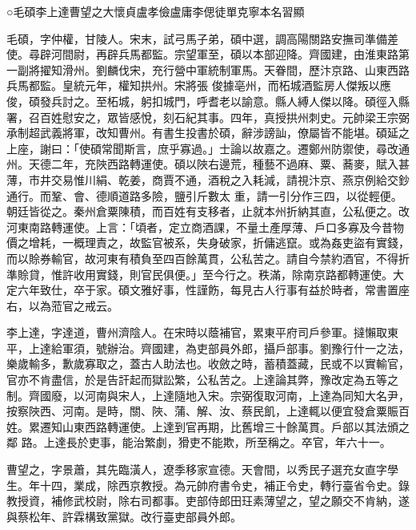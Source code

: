 
\begin{pinyinscope}

 ○毛碩李上達曹望之大懷貞盧孝儉盧庸李偲徒單克寧本名習顯



 毛碩，字仲權，甘陵人。宋末，試弓馬子弟，碩中選，調高陽關路安撫司準備差使。尋辟河間尉，再辟兵馬都監。宗望軍至，碩以本部迎降。齊國建，由淮東路第一副將擢知滑州。劉麟伐宋，充行營中軍統制軍馬。天眷間，歷汴京路、山東西路兵馬都監。皇統元年，權知拱州。宋將張
 俊據亳州，而柘城酒監房人傑叛以應俊，碩發兵討之。至柘城，躬扣城門，呼耆老以諭意。縣人縛人傑以降。碩徑入縣署，召百姓慰安之，眾皆感悅，刻石紀其事。四年，真授拱州刺史。元帥梁王宗弼承制超武義將軍，改知曹州。有書生投書於碩，辭涉謗訕，僚屬皆不能堪。碩延之上座，謝曰：「使碩常聞斯言，庶乎寡過。」士論以故嘉之。遷鄭州防禦使，尋改通州。天德二年，充陜西路轉運使。碩以陜右邊荒，種藝不過麻、粟、蕎麥，賦入甚薄，市井交易惟川絹、乾姜，商賈不通，酒稅之入耗減，請視汴京、燕京例給交鈔通行。而鞏、會、德順道路多險，鹽引斤數太
 重，請一引分作三四，以從輕便。朝廷皆從之。秦州倉粟陳積，而百姓有支移者，止就本州折納其直，公私便之。改河東南路轉運使。上言：「頃者，定立商酒課，不量土產厚薄、戶口多寡及今昔物價之增耗，一概理責之，故監官被系，失身破家，折傭逃竄。或為姦吏盜有實錢，而以賒券輸官，故河東有積負至四百餘萬貫，公私苦之。請自今禁約酒官，不得折準賒貸，惟許收用實錢，則官民俱便。」至今行之。秩滿，除南京路都轉運使。大定六年致仕，卒于家。碩文雅好事，性謹飭，每見古人行事有益於時者，常書置座右，以為蒞官之戒云。



 李上達，字達道，曹州濟陰人。在宋時以蔭補官，累東平府司戶參軍。撻懶取東平，上達給軍須，號辦治。齊國建，為吏部員外郎，攝戶部事。劉豫行什一之法，樂歲輸多，歉歲寡取之，蓋古人助法也。收斂之時，蓄積蓋藏，民或不以實輸官，官亦不肯盡信，於是告訐起而獄訟繁，公私苦之。上達論其弊，豫改定為五等之制。齊國廢，以河南與宋人，上達隨地入宋。宗弼復取河南，上達為同知大名尹，按察陜西、河南。是時，關、陜、蒲、解、汝、蔡民飢，上達輒以便宜發倉粟賑百姓。累遷知山東西路轉運使。上達到官再期，比舊增三十餘萬貫。戶部以其法頒之鄰
 路。上達長於吏事，能治繁劇，猾吏不能欺，所至稱之。卒官，年六十一。



 曹望之，字景蕭，其先臨潢人，遼季移家宣德。天會間，以秀民子選充女直字學生。年十四，業成，除西京教授。為元帥府書令史，補正令史，轉行臺省令史。錄教授資，補修武校尉，除右司都事。吏部侍郎田玨素薄望之，望之願交不肯納，遂與蔡松年、許霖構致黨獄。改行臺吏部員外郎。




\end{pinyinscope}
